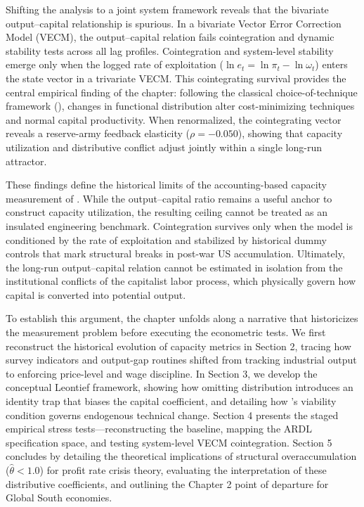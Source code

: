 Shifting the analysis to a joint system framework reveals that the bivariate output--capital relationship is spurious. In a bivariate Vector Error Correction Model (VECM), the output--capital relation fails cointegration and dynamic stability tests across all lag profiles. Cointegration and system-level stability emerge only when the logged rate of exploitation ($\ln e_t = \ln \pi_t - \ln \omega_t$) enters the state vector in a trivariate VECM. This cointegrating survival provides the central empirical finding of the chapter: following the classical choice-of-technique framework (\citealp{Kurz1986}), changes in functional distribution alter cost-minimizing techniques and normal capital productivity. When renormalized, the cointegrating vector reveals a reserve-army feedback elasticity ($\rho = -0.050$), showing that capacity utilization and distributive conflict adjust jointly within a single long-run attractor.

These findings define the historical limits of the accounting-based capacity measurement of \citet{Shaikh2016}. While the output–capital ratio remains a useful anchor to construct capacity utilization, the resulting ceiling cannot be treated as an insulated engineering benchmark. Cointegration survives only when the model is conditioned by the rate of exploitation and stabilized by historical dummy controls that mark structural breaks in post-war US accumulation. Ultimately, the long-run output–capital relation cannot be estimated in isolation from the institutional conflicts of the capitalist labor process, which physically govern how capital is converted into potential output.

To establish this argument, the chapter unfolds along a narrative that historicizes the measurement problem before executing the econometric tests. We first reconstruct the historical evolution of capacity metrics in Section 2, tracing how survey indicators and output-gap routines shifted from tracking industrial output to enforcing price-level and wage discipline. In Section 3, we develop the conceptual Leontief framework, showing how omitting distribution introduces an identity trap that biases the capital coefficient, and detailing how \citet{Basu2022}'s viability condition governs endogenous technical change. Section 4 presents the staged empirical stress tests—reconstructing the baseline, mapping the ARDL specification space, and testing system-level VECM cointegration. Section 5 concludes by detailing the theoretical implications of structural overaccumulation ($\hat{\theta} < 1.0$) for profit rate crisis theory, evaluating the interpretation of these distributive coefficients, and outlining the Chapter 2 point of departure for Global South economies.

